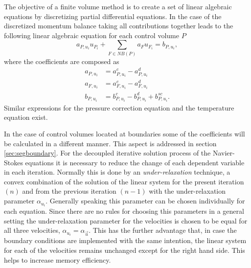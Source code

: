     The objective of a finite volume method is to create a set of linear algebraic equations by discretizing partial differential equations. In the case of the discretized momentum balance taking all contributions together leads to the following linear algebraic equation for each control volume \(P\)
    \begin{displaymath}
      a_{P,u_i} u_{P_i} + \sum_{F \in NB(P)} a_F u_{F_i} = b_{P,u_i},
    \end{displaymath}
    where the coefficients are composed as
    \begin{align}
      a_{P,u_i} &= a_{P,u_i}^c - a_{P,u_i}^d \\
      a_{F,u_i} &= a_{F,u_i}^c - a_{F,u_i}^d \\
      b_{P,u_i} &= b_{P,u_i}^c - b_{P,u_i}^d + b_{P,u_i}^{sc}.
    \end{align}
    Similar expressions for the pressure correction equation and the temperature equation exist.

    In the case of control volumes located at boundaries some of the coefficients will be calculated in a different manner. This aspect is addressed in section \ref{sec:segboundary}. For the decoupled iterative solution process of the Navier-Stokes equations it is necessary to reduce the change of each dependent variable in each iteration. Normally this is done by an \emph{under-relaxation} technique, a convex combination of the solution of the linear system for the present iteration \((n)\) and from the previous iteration \((n-1)\) with the under-relaxation parameter \(\alpha_{u_i}\). Generally speaking this parameter can be chosen individually for each equation. Since there are no rules for choosing this parameters in a general setting the under-relaxation parameter for the velocities is chosen to be equal for all three velocities, \(\alpha_{u_i} = \alpha_{\vec{u}}\). This has the further advantage that, in case the boundary conditions are implemented with the same intention, the linear system for each of the velocities remains unchanged except for the right hand side. This helps to increase memory efficiency.

